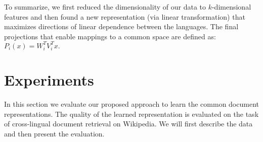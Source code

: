 \documentclass{article} %
\begin{document}
To summarize, we first reduced the dimensionality of our data to $k$-dimensional features and then found a new representation (via linear transformation) that maximizes directions of linear dependence between the languages. The final projections that enable mappings to a common space are defined as: $P_i(x) = W_i^T V_i^T x.$

\section{Experiments}
In this section we evaluate our proposed approach to learn the common document representations. The quality of the learned representation is evaluated on the task of cross-lingual document retrieval on Wikipedia. We will first describe the data and then present the evaluation.
\end{document}
